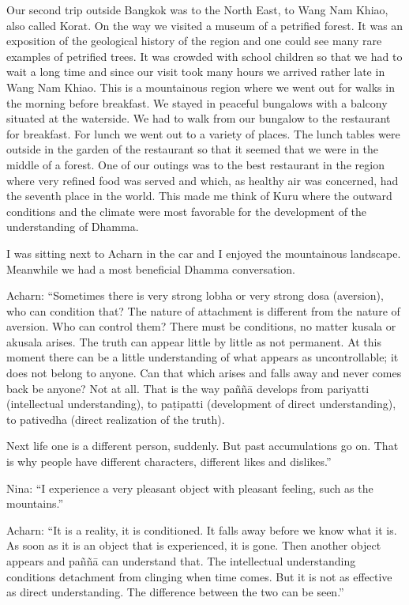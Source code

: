 Our second trip outside Bangkok was to the North East, to Wang Nam
Khiao, also called Korat. On the way we visited a museum of a petrified
forest. It was an exposition of the geological history of the region and
one could see many rare examples of petrified trees. It was crowded with
school children so that we had to wait a long time and since our visit
took many hours we arrived rather late in Wang Nam Khiao. This is a
mountainous region where we went out for walks in the morning before
breakfast. We stayed in peaceful bungalows with a balcony situated at
the waterside. We had to walk from our bungalow to the restaurant for
breakfast. For lunch we went out to a variety of places. The lunch
tables were outside in the garden of the restaurant so that it seemed
that we were in the middle of a forest. One of our outings was to the
best restaurant in the region where very refined food was served and
which, as healthy air was concerned, had the seventh place in the world.
This made me think of Kuru where the outward conditions and the climate
were most favorable for the development of the understanding of Dhamma.

I was sitting next to Acharn in the car and I enjoyed the mountainous
landscape. Meanwhile we had a most beneficial Dhamma conversation.

Acharn: ``Sometimes there is very strong lobha or very strong dosa
(aversion), who can condition that? The nature of attachment is
different from the nature of aversion. Who can control them? There must
be conditions, no matter kusala or akusala arises. The truth can appear
little by little as not permanent. At this moment there can be a little
understanding of what appears as uncontrollable; it does not belong to
anyone. Can that which arises and falls away and never comes back be
anyone? Not at all. That is the way paññā develops from pariyatti
(intellectual understanding), to paṭipatti (development of direct
understanding), to pativedha (direct realization of the truth).

Next life one is a different person, suddenly. But past accumulations go
on. That is why people have different characters, different likes and
dislikes.''

Nina: ``I experience a very pleasant object with pleasant feeling, such
as the mountains.''

Acharn: ``It is a reality, it is conditioned. It falls away before we
know what it is. As soon as it is an object that is experienced, it is
gone. Then another object appears and paññā can understand that. The
intellectual understanding conditions detachment from clinging when time
comes. But it is not as effective as direct understanding. The
difference between the two can be seen.''

